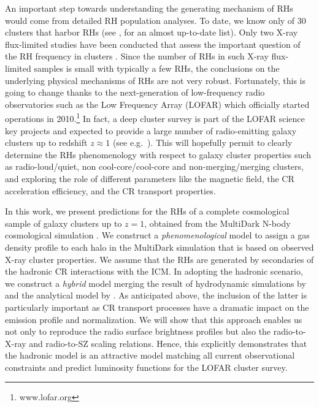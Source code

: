 \documentclass[traditabstract]{aa}
\begin{document}
An important step towards understanding the generating mechanism of RHs would
come from detailed RH population analyses. To date, we know only of 30 clusters
that harbor RHs (see \citealp{2011A&A...527A..99E}, for an almost up-to-date
list). Only two X-ray flux-limited studies have been conducted that assess the
important question of the RH frequency in clusters \citep{1999NewA....4..141G,
  VenturiGMRT_2}. Since the number of RHs in such X-ray flux-limited samples is
small with typically a few RHs, the conclusions on the underlying physical
mechanisms of RHs are not very robust. Fortunately, this is going to change
thanks to the next-generation of low-frequency radio observatories such as the
Low Frequency Array (LOFAR) which officially started operations in
2010.\footnote[2]{www.lofar.org} In fact, a deep cluster survey is part of the
LOFAR science key projects and expected to provide a large number of
radio-emitting galaxy clusters up to redshift $z\approx1$ (see
e.g.~\citealp{2010A&A...509A..68C,2012JApA..tmp...34R}).  This will hopefully
permit to clearly determine the RHs phenomenology with respect to galaxy cluster
properties such as radio-loud/quiet, non cool-core/cool-core and
non-merging/merging clusters, and exploring the role of different parameters
like the magnetic field, the CR acceleration efficiency, and the CR transport
properties.

In this work, we present predictions for the RHs of a complete cosmological
sample of galaxy clusters up to $z= 1$, obtained from the MultiDark N-body
cosmological simulation \citep{2011arXiv1104.5130P}. We construct a
\emph{phenomenological} model to assign a gas density profile to each halo in
the MultiDark simulation that is based on observed X-ray cluster properties. We
assume that the RHs are generated by secondaries of the hadronic CR interactions
with the ICM. In adopting the hadronic scenario, we construct a \emph{hybrid}
model merging the result of hydrodynamic simulations by
\cite{2010MNRAS.409..449P} and the analytical model by
\cite{2011A&A...527A..99E}.  As anticipated above, the inclusion of the latter
is particularly important as CR transport processes have a dramatic impact on
the emission profile and normalization. We will show that this approach enables
us not only to reproduce the radio surface brightness profiles but also the
radio-to-X-ray and radio-to-SZ scaling relations. Hence, this explicitly
demonstrates that the hadronic model is an attractive model matching all current
observational constraints and predict luminosity functions for the LOFAR cluster
survey.
\end{document}
